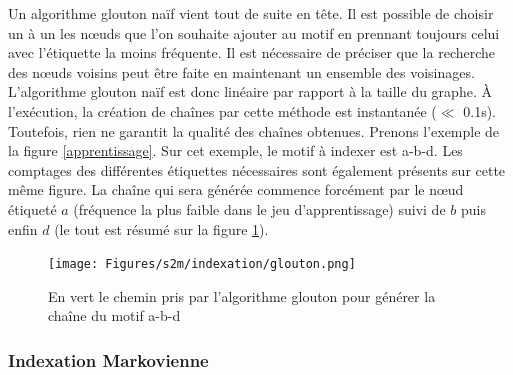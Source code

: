 % 
%  


Un algorithme glouton naïf vient tout de suite en tête.
Il est possible de choisir un à un les n\oe{}uds que l'on souhaite ajouter au motif en prennant toujours celui avec l'étiquette la moins fréquente.
Il est nécessaire de préciser que la recherche des n\oe{}uds voisins peut être faite en maintenant un ensemble des voisinages.
L'algorithme glouton naïf est donc linéaire par rapport à la taille du graphe.
À l'exécution, la création de chaînes par cette méthode est instantanée ($\ll$ 0.1s).
Toutefois, rien ne garantit la qualité des chaînes obtenues.
Prenons l'exemple de la figure \ref{apprentissage}.
Sur cet exemple, le motif à indexer est a-b-d.
Les comptages des différentes étiquettes nécessaires sont également présents sur cette même figure.
La chaîne qui sera générée commence forcément par le n\oe{}ud étiqueté $a$ (fréquence la plus faible dans le jeu d'apprentissage) suivi de $b$ puis enfin $d$ (le tout est résumé sur la figure \ref{glouton}).

\begin{figure}[!ht]
  \begin{center}
    \texttt{[image: Figures/s2m/indexation/glouton.png]}
    \caption{\label{glouton}En vert le chemin pris par l'algorithme glouton pour générer la chaîne du motif a-b-d}
  \end{center}
\end{figure}

\subsubsection{Indexation Markovienne}

